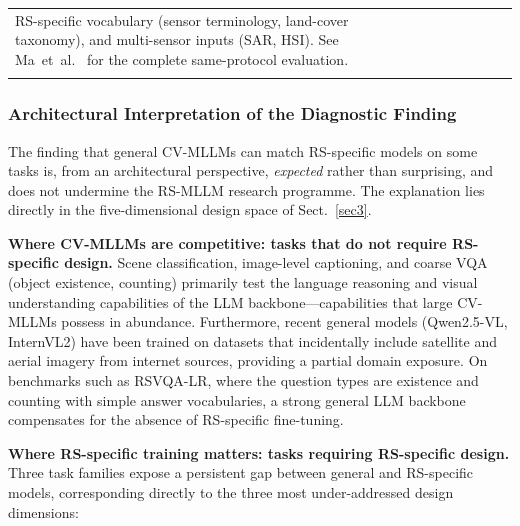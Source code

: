 \begin{table}[t]
\begin{tabular*}{\textwidth}{@{\extracolsep\fill}p{2.2cm}p{0.9cm}p{0.9cm}p{0.9cm}p{1.4cm}p{1.4cm}p{1.3cm}p{3.0cm}}
{  RS-specific vocabulary (sensor terminology, land-cover taxonomy), and multi-sensor inputs
  (SAR, HSI). See Ma~et~al.~\cite{ma2026dsorsp} for the complete same-protocol evaluation.
} \\
\botrule
\end{tabular*}
\end{table}

\subsubsection{Architectural Interpretation of the Diagnostic Finding}\label{sec6:cvmllm_interp}

The finding that general CV-MLLMs can match RS-specific models on some tasks is,
from an architectural perspective, \emph{expected} rather than surprising, and does
not undermine the RS-MLLM research programme. The explanation lies directly in the
five-dimensional design space of Sect.~\ref{sec3}.

\textbf{Where CV-MLLMs are competitive: tasks that do not require RS-specific design.}
Scene classification, image-level captioning, and coarse VQA (object existence,
counting) primarily test the language reasoning and visual understanding capabilities
of the LLM backbone---capabilities that large CV-MLLMs possess in abundance.
Furthermore, recent general models (Qwen2.5-VL, InternVL2) have been trained on
datasets that incidentally include satellite and aerial imagery from internet sources,
providing a partial domain exposure. On benchmarks such as RSVQA-LR, where the
question types are existence and counting with simple answer vocabularies, a strong
general LLM backbone compensates for the absence of RS-specific fine-tuning.

\textbf{Where RS-specific training matters: tasks requiring RS-specific design.}
Three task families expose a persistent gap between general and RS-specific models,
corresponding directly to the three most under-addressed design dimensions:


